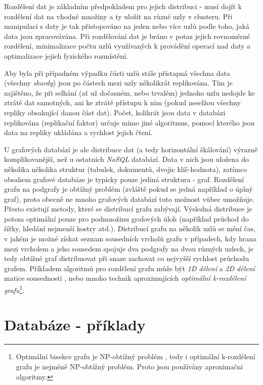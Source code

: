 Rozdělení dat je základním předpokladem pro jejich distribuci - musí dojít k rozdělení dat na vhodné množiny a ty uložit na různé uzly v clusteru. Při manipulaci s daty je tak přistopováno na jeden nebo více uzlů podle toho, jaká data jsou zpracovávána. Při rozdělování dat je bráno v potaz jejich rovnoměrné rozdělení, minimalizace počtu uzlů využívaných k provádění operací nad daty a optimalizace jejich fyzického rozmístění.

Aby byla při případném výpadku části uzlů stále přístapná všechna data (všechny \textit{shardy}) jsou po částech mezi uzly několikrát replikována. Tím je zajištěno, že při selhání (ať už dočasném, nebo trvalém) jednoho uzlu nedojde ke ztrátě dat samotných, ani ke ztrátě přístupu k nim (pokud neselžou všechny repliky obsahující danou část dat). Počet, kolikrát jsou data v databázi replikována (replikační faktor) určuje mimo jiné algoritmus, pomocí kterého jsou data na repliky ukládána a rychlost jejich čtení.

U grafových databází je ale distribuce dat (a tedy horizontální škálování) výrazně komplikovanější, než u ostatních \textit{NoSQL} databází. Data v nich jsou uložena do několika několika struktur (tabulek, dokumentů, dvojic klíč-hodnota), zatímco obsahem grafové databáze je typicky pouze jediná struktura - graf. Rozdělení grafu na podgrafy je obtížný problém (zvláště pokud se jedná například o úplný graf), proto obecně ne mnoho grafových databází tuto možnost vůbec umožňuje. Přesto existují metody, které se distribucí grafu zabývají. Výsledná distribuce je potom optimální pouze pro podmnožinu grafových úloh (například průchod do šířky, hledání nejmenší kostry atd.). Distribucí grafu na několik uzlů se mění čas, v jakém je možné získat seznam sousedních vrcholů grafu v případech, kdy hrana mezi vrcholem a jeho sousedem spojuje dva podgrafy na dvou různých uzlech, je tedy obtížné graf distribuovat při snaze zachovat co nejvyšší rychlost průchodu grafem. Příkladem algoritmů pro rozdělení grafu může být \textit{1D dělení} a \textit{2D dělení} matice sousednosti \cite{Yoo05}, nebo mnoho technik aproximujících \textit{optimální k-rozdělení grafu}\footnote{Optimální bisekce grafu je NP-obtížný problém \cite{Garey90}, tedy i optimální k-rozdělení grafu je nejméně NP-obtížný problém. Proto jsou používány aproximační algoritmy.}.\cite{George78} \cite{Fiduccia82} \cite{Battiti99}

\section{Databáze - příklady}
\label{sec:gdb-databaze}

